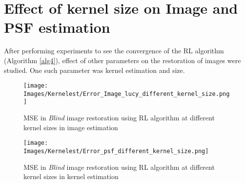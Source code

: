 \documentclass[a4paper]{book}
\begin{document}
%


\section[\Large Effect of kernel]{\Large Effect of kernel size on Image and PSF estimation}\label{secKern}After performing experiments to see the convergence of the RL algorithm (Algorithm \ref{alg4}), effect of other parameters on the restoration of images were studied. One such parameter was kernel estimation and size.\cite{bookchapt3}

\begin{figure}[H]
	\centering
	\texttt{[image: Images/Kernelest/Error\_Image\_lucy\_different\_kernel\_size.png]}
	\caption[MSE in image estimation for kernel sizes]{MSE in \textit{Blind} image restoration using RL algorithm at different kernel sizes in image estimation}
	\label{BIDkernel}
\end{figure}

\begin{figure}[H]
	\centering
	\texttt{[image: Images/Kernelest/Error\_psf\_different\_kernel\_size.png]}
	\caption[MSE in kernel estimation for kernel sizes]{MSE in \textit{Blind} image restoration using RL algorithm at different kernel sizes in kernel estimation}
	\label{KernelEstkernel}
\end{figure}
\newpage
\end{document}
